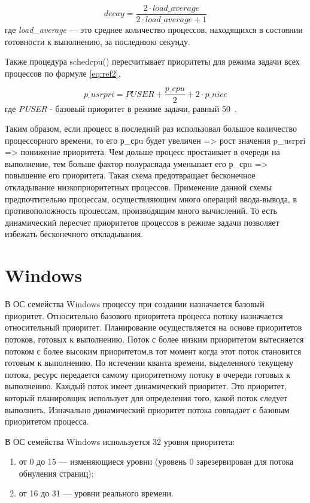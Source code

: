 \begin{equation}
\label{eq:ref1}
decay = \frac{2 \cdot load\_average}{2 \cdot load\_average + 1}
\end{equation} где
\textit{load\_average} --- это среднее количество процессов, находящихся в состоянии готовности к выполнению, за последнюю секунду.

Также процедура schedcpu() пересчитывает приоритеты для режима задачи
всех процессов по формуле \ref{eq:ref2},

\begin{equation}
\label{eq:ref2}
p\_usrpri = PUSER + \frac{p\_cpu}{2} + 2 \cdot p\_nice
\end{equation}где \textit{PUSER} - базовый приоритет в режиме задачи, равный 50~\cite{unix}.

Таким образом, если процесс в последний раз использовал большое количество процессорного времени, то его р\_срu будет увеличен => рост значения p\_usrpri => понижение приоритета.  Чем дольше процесс простаивает в очереди на выполнение, тем больше фактор полураспада уменьшает его р\_срu => повышение его приоритета. Такая схема предотвращает бесконечное откладывание низкоприоритетных процессов. Применение данной схемы предпочтительно процессам, осуществляющим много операций ввода-вывода, в противоположность процессам, производящим много вычислений. То есть динамический пересчет приоритетов процессов в режиме задачи позволяет избежать бесконечного откладывания.

\section{Windows}
В ОС семейства Windows  процессу при создании назначается базовый приоритет. Относительно
базового приоритета процесса потоку назначается относительный приоритет. Планирование осуществляется на основе приоритетов потоков, готовых к выполнению. Поток с более низким приоритетом 
вытесняется потоком с более высоким приоритетом,в тот момент когда этот поток становится готовым к выполнению. По истечении кванта времени, выделенного 
текущему потока, ресурс передается самому приоритетному потоку в очереди готовых к выполнению. Каждый поток имеет динамический приоритет. Это приоритет, который планировщик использует для определения того, какой поток следует 
выполнить. Изначально динамический приоритет потока совпадает с базовым приоритетом процесса.

В ОС семейства Windows используется 32 уровня приоритета:
\begin{enumerate}
	\item от 0 до 15 --- изменяющиеся уровни (уровень 0 зарезервирован для потока обнуления страниц);
	\item от 16 до 31 --- уровни реального времени.
\end{enumerate} 

